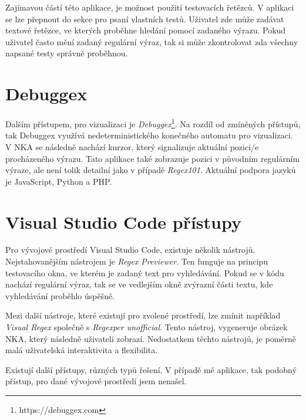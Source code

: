 Zajímavou částí této aplikace, je možnost použití testovacích řetězců.
V aplikaci se lze přepnout do sekce pro psaní vlastních testů.
Uživatel zde může zadávat textové řetězce, ve kterých proběhne hledání pomocí zadaného výrazu.
Pokud uživatel často mění zadaný regulární výraz, tak si může zkontrolovat zda všechny napsané testy správně proběhnou.

\section{Debuggex}

Dalším přístupem, pro vizualizaci je \textit{Debuggex}\footnote{https://debuggex.com}.
Na rozdíl od zmíněných přístupů, tak Debuggex využívá nedeterministického konečného automatu pro vizualizaci.
V NKA se následně nachází kurzor, který signalizuje aktuální pozici/e procházeného výrazu.
Tato aplikace také zobrazuje pozici v původním regulárním výraze, ale není tolik detailní jako v případě \textit{Regex101}.
Aktuální podpora jazyků je JavaScript, Python a PHP.

\section{Visual Studio Code přístupy}

Pro vývojové prostředí Visual Studio Code, existuje několik nástrojů.
Nejstahovanějším nástrojem je \textit{Regex Previewer}.
Ten funguje na principu testovacího okna, ve kterém je zadaný text pro vyhledávání.
Pokud se v kódu nachází regulární výraz, tak se ve vedlejším okně zvýrazní části textu, kde vyhledávání proběhlo úspěšně. 

Mezi další nástroje, které existují pro zvolené prostředí, lze zmínit například \textit{Visual Regex} společně s \textit{Regexper unofficial}.
Tento nástroj, vygeneruje obrázek NKA, který následně uživateli zobrazí.
Nedostatkem těchto nástrojů, je poměrně malá uživatelská interaktivita a flexibilita.

Existují další přístupy, různých typů řešení. 
V případě mé aplikace, tak podobný přístup, pro dané vývojové prostředí jsem nenašel.